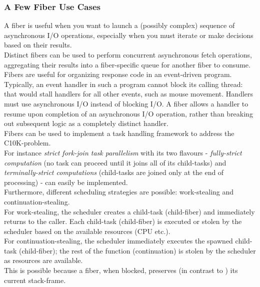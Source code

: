 \subsubsection*{A Few Fiber Use Cases}
A fiber is useful when you want to launch a (possibly complex) sequence of
asynchronous I/O operations, especially when you must iterate or make
decisions based on their results.\\
\newline
Distinct fibers can be used to perform concurrent asynchronous fetch
operations, aggregating their results into a fiber-specific queue for another
fiber to consume.\\
\newline
Fibers are useful for organizing response code in an event-driven program.
Typically, an event handler in such a program cannot block its calling thread:
that would stall handlers for all other events, such as mouse movement.
Handlers must use asynchronous I/O instead of blocking I/O. A fiber allows a
handler to resume upon completion of an asynchronous I/O operation, rather
than breaking out subsequent logic as a completely distinct handler.\\
\newline
Fibers can be used to implement a task handling framework to address the
C10K-problem\cite{c10k}.\\
For instance \textit{strict fork-join task parallelism}\cite{n3832} with its two
flavours - \textit{fully-strict computation}\cite{n3832} (no task
can proceed until it joins all of its child-tasks) and
\textit{terminally-strict computations}\cite{n3832} (child-tasks are joined
only at the end of processing) - can easily be implemented.\\
Furthermore, different scheduling strategies are possible: work-stealing and
continuation-stealing.\\
For work-stealing, the scheduler creates a child-task (child-fiber)
and immediately returns to the caller. Each child-task (child-fiber) is executed or
stolen by the scheduler based on the available resources (CPU etc.).\\
For continuation-stealing, the scheduler immediately executes the
spawned child-task (child-fiber); the rest of the function
(continuation) is stolen by the scheduler as resources are available.\\
This is possible because a fiber, when blocked, preserves (in contrast to \tbb)
its current stack-frame.
\newline
